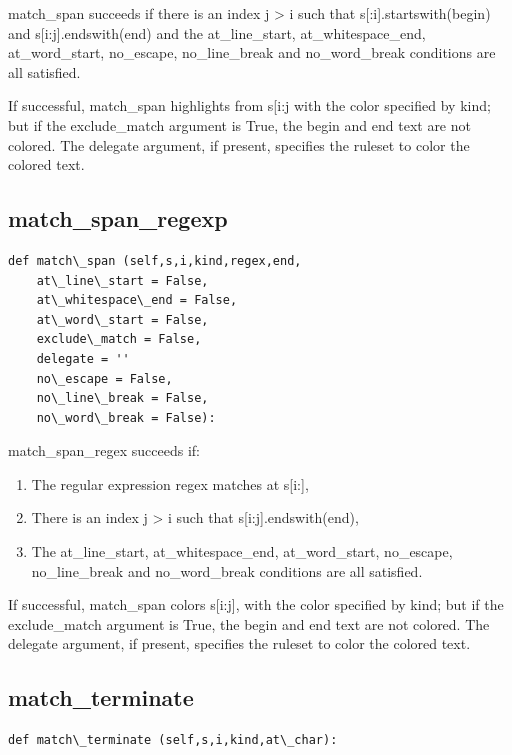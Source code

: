 \documentclass[a4paper,10pt,english]{sphinxmanual}
\begin{document}
match\_span succeeds if there is an index j \textgreater{} i such that
s{[}:i{]}.startswith(begin) and s{[}i:j{]}.endswith(end) and the
at\_line\_start, at\_whitespace\_end, at\_word\_start,
no\_escape, no\_line\_break and no\_word\_break conditions are all satisfied.

If successful, match\_span highlights from s{[}i:j
with the color specified by kind;
but if the exclude\_match argument is True, the begin and end text are not colored.
The delegate argument, if present, specifies the ruleset to color the colored text.


\subsection{match\_span\_regexp}
\label{coloring:match-span-regexp}
\begin{Verbatim}[commandchars=\\\{\}]
def match\_span (self,s,i,kind,regex,end,
    at\_line\_start = False,
    at\_whitespace\_end = False,
    at\_word\_start = False,
    exclude\_match = False,
    delegate = ''
    no\_escape = False,
    no\_line\_break = False,
    no\_word\_break = False):
\end{Verbatim}

match\_span\_regex succeeds if:
\begin{enumerate}
\item {} 
The regular expression regex matches at s{[}i:{]},

\item {} 
There is an index j \textgreater{} i such that s{[}i:j{]}.endswith(end),

\item {} 
The at\_line\_start, at\_whitespace\_end, at\_word\_start,
no\_escape, no\_line\_break and no\_word\_break conditions are all satisfied.

\end{enumerate}

If successful, match\_span colors s{[}i:j{]},
with the color specified by kind;
but if the exclude\_match argument is True, the begin and end text are not colored.
The delegate argument, if present, specifies the ruleset to color the colored text.


\subsection{match\_terminate}
\label{coloring:match-terminate}
\begin{Verbatim}[commandchars=\\\{\}]
def match\_terminate (self,s,i,kind,at\_char):
\end{Verbatim}
\end{document}
